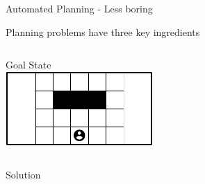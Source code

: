 \documentclass[usenames,dvipsnames]{beamer}
\begin{document}
\begin{frame}[c]{Automated Planning - Less boring}
\begin{block}{Planning problems have three key ingredients}
\begin{columns}[t]
		\begin{column}{.23\textwidth}
			\begin{center}
				Goal State\\
				\includegraphics[width=.9\textwidth]{fig/goal-state.pdf}
			\end{center}
		\end{column}
	\end{columns}
	\end{block}
	
	\begin{block}{Solution}
		\begin{center}
		\end{center}
	\end{block}
\end{frame}
\end{document}

